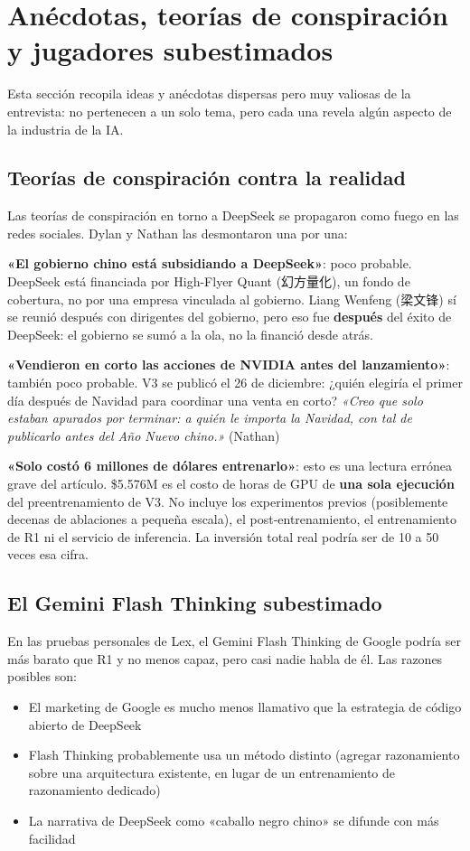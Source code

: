 \section{Anécdotas, teorías de conspiración y jugadores subestimados}

Esta sección recopila ideas y anécdotas dispersas pero muy valiosas de la entrevista: no pertenecen a un solo tema, pero cada una revela algún aspecto de la industria de la IA.

\subsection{Teorías de conspiración contra la realidad}

Las teorías de conspiración en torno a DeepSeek se propagaron como fuego en las redes sociales. Dylan y Nathan las desmontaron una por una:

\textbf{«El gobierno chino está subsidiando a DeepSeek»}: poco probable. DeepSeek está financiada por High-Flyer Quant (幻方量化), un fondo de cobertura, no por una empresa vinculada al gobierno. Liang Wenfeng (梁文锋) sí se reunió después con dirigentes del gobierno, pero eso fue \textbf{después} del éxito de DeepSeek: el gobierno se sumó a la ola, no la financió desde atrás.

\textbf{«Vendieron en corto las acciones de NVIDIA antes del lanzamiento»}: también poco probable. V3 se publicó el 26 de diciembre: ¿quién elegiría el primer día después de Navidad para coordinar una venta en corto? \textit{«Creo que solo estaban apurados por terminar: a quién le importa la Navidad, con tal de publicarlo antes del Año Nuevo chino.»} (Nathan)

\textbf{«Solo costó 6 millones de dólares entrenarlo»}: esto es una lectura errónea grave del artículo. \$5.576M es el costo de horas de GPU de \textbf{una sola ejecución} del preentrenamiento de V3. No incluye los experimentos previos (posiblemente decenas de ablaciones a pequeña escala), el post-entrenamiento, el entrenamiento de R1 ni el servicio de inferencia. La inversión total real podría ser de 10 a 50 veces esa cifra.

\subsection{El Gemini Flash Thinking subestimado}

En las pruebas personales de Lex, el Gemini Flash Thinking de Google podría ser más barato que R1 y no menos capaz, pero casi nadie habla de él. Las razones posibles son:
\begin{itemize}
    \item El marketing de Google es mucho menos llamativo que la estrategia de código abierto de DeepSeek
    \item Flash Thinking probablemente usa un método distinto (agregar razonamiento sobre una arquitectura existente, en lugar de un entrenamiento de razonamiento dedicado)
    \item La narrativa de DeepSeek como «caballo negro chino» se difunde con más facilidad
\end{itemize}

